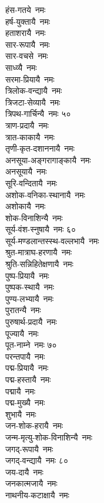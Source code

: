 \begin{multicols}{2}
\begin{flushleft}
हंस-गतये~नमः\\
हर्ष-युक्तायै~नमः\\
हताशरायै~नमः\\
सार-रूपायै~नमः\\
सार-वचसे~नमः\\
साध्व्यै~नमः\\
सरमा-प्रियायै~नमः\\
त्रिलोक-वन्द्यायै~नमः\\
त्रिजटा-सेव्यायै~नमः\\
त्रिपथ-गार्चिन्यै~नमः \hfill ५०\\
त्राण-प्रदायै~नमः\\
त्रात-काकायै~नमः\\
तृणी-कृत-दशाननायै~नमः\\
अनसूया-अङ्गरागाङ्कायै~नमः\\
अनसूयायै~नमः\\
सूरि-वन्दितायै~नमः\\
अशोक-वनिका-स्थानायै~नमः\\
अशोकायै~नमः\\
शोक-विनाशिन्यै~नमः\\
सूर्य-वंश-स्नुषायै~नमः \hfill ६०\\
सूर्य-मण्डलान्तस्स्थ-वल्लभायै~नमः\\
श्रुत-मात्राघ-हरणायै~नमः\\
श्रुति-सन्निहितेक्षणायै~नमः\\
पुष्प-प्रियायै~नमः\\
पुष्पक-स्थायै~नमः\\
पुण्य-लभ्यायै~नमः\\
पुरातन्यै~नमः\\
पुरुषार्थ-प्रदायै~नमः\\
पूज्यायै~नमः\\
पूत-नाम्ने~नमः \hfill ७०\\
परन्तपायै~नमः \\
पद्म-प्रियायै~नमः\\
पद्म-हस्तायै~नमः\\
पद्मायै~नमः\\
पद्म-मुख्यै~नमः\\
शुभायै~नमः\\
जन-शोक-हरायै~नमः\\
जन्म-मृत्यु-शोक-विनाशिन्यै~नमः\\
जगद्-रूपायै~नमः\\
जगद्-वन्द्यायै~नमः \hfill ८०\\
जय-दायै~नमः \\
जनकात्मजायै~नमः\\
नाथनीय-कटाक्षायै~नमः\\

\end{flushleft}
\end{multicols}

